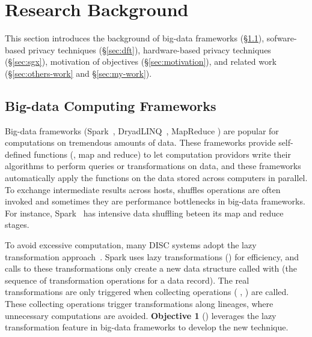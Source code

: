 \vspace{-.15in}\section{Research Background} 
\label{sec:background}\vspace{-.075in}


This section introduces the background of big-data 
frameworks (\S\ref{sec:bigdata}), sofware-based privacy techniques  
(\S\ref{sec:dft}), hardware-based privacy techniques (\S\ref{sec:sgx}), 
motivation of objectives (\S\ref{sec:motivation}), and related work 
(\S\ref{sec:others-work} and \S\ref{sec:my-work}).


\vspace{-.15in}\subsection{Big-data Computing Frameworks} 
\label{sec:bigdata}\vspace{-.075in}

Big-data frameworks (\eg Spark~\cite{nsdi12:spark}, 
DryadLINQ~\cite{osdi08:dryad}, MapReduce \cite{mapreduce}) are popular for 
computations on tremendous amounts of data. These frameworks provide 
self-defined functions (\eg, map and reduce) to let computation providors 
write their algorithms to perform queries or transformations on data, and these 
frameworks automatically apply the functions on the data stored across 
computers in parallel. To exchange intermediate results across hosts, shuffles 
operations are often invoked and sometimes they are performance bottlenecks in 
big-data frameworks. For instance, Spark~\cite{nsdi12:spark} has intensive data 
shuffling beteen its map and reduce stages.



To avoid excessive computation, many DISC systems adopt the lazy transformation 
approach~\cite{pig:vldb08,nsdi12:spark,osdi08:dryad}. Spark uses lazy 
transformations (\eg {}) for efficiency, and calls to these 
transformations only create a new data structure called  with 
 (the sequence of transformation operations for a data record).
The real transformations are only triggered when collecting operations (\eg 
{}, ) are called. These collecting operations trigger 
transformations along lineages, where unnecessary computations are avoided. 
\textbf{Objective 1} () leverages the lazy transformation
feature in big-data frameworks to develop the new \lazyp technique.

